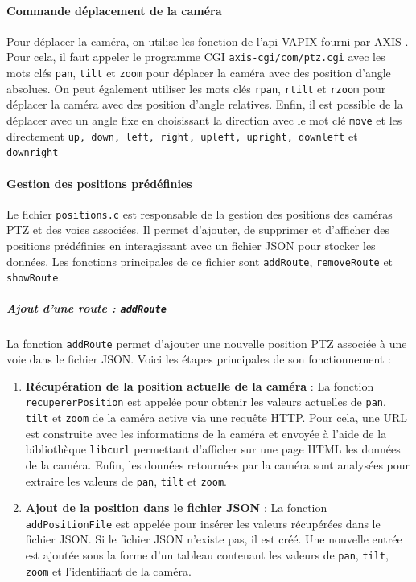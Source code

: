\documentclass[a4paper, 11pt, french]{article}
\begin{document}
\paragraph{Commande déplacement de la caméra}
Pour déplacer la caméra, on utilise les fonction de l'api VAPIX fourni par AXIS \cite{manAPIAxis}. Pour cela, il faut appeler le programme CGI \texttt{axis-cgi/com/ptz.cgi} avec les mots clés \texttt{pan}, \texttt{tilt} et \texttt{zoom} pour déplacer la caméra avec des position d'angle absolues. On peut également utiliser les mots clés \texttt{rpan}, \texttt{rtilt} et \texttt{rzoom} pour déplacer la caméra avec des position d'angle relatives. Enfin, il est possible de la déplacer avec un angle fixe en choisissant la direction avec le mot clé \texttt{move} et les directement \texttt{up, down, left, right, upleft, upright, downleft} et  \texttt{downright} 

\paragraph{Gestion des positions prédéfinies} \label{par:positions}
Le fichier \texttt{positions.c} est responsable de la gestion des positions des caméras PTZ et des voies associées. Il permet d'ajouter, de supprimer et d'afficher des positions prédéfinies en interagissant avec un fichier JSON pour stocker les données. Les fonctions principales de ce fichier sont \texttt{addRoute}, \texttt{removeRoute} et \texttt{showRoute}.

\subparagraph{Ajout d'une route : \texttt{addRoute}}

La fonction \texttt{addRoute} permet d'ajouter une nouvelle position PTZ associée à une voie dans le fichier JSON. Voici les étapes principales de son fonctionnement :
\begin{enumerate}
    \item \textbf{Récupération de la position actuelle de la caméra} :
    La fonction \texttt{recupererPosition} est appelée pour obtenir les valeurs actuelles de \texttt{pan}, \texttt{tilt} et \texttt{zoom} de la caméra active via une requête HTTP. Pour cela, une URL est construite avec les informations de la caméra et envoyée à l'aide de la bibliothèque \texttt{libcurl} permettant d'afficher sur une page HTML les données de la caméra. Enfin, les données retournées par la caméra sont analysées pour extraire les valeurs de \texttt{pan}, \texttt{tilt} et \texttt{zoom}.
    \item \textbf{Ajout de la position dans le fichier JSON} :
    La fonction \texttt{addPositionFile} est appelée pour insérer les valeurs récupérées dans le fichier JSON. Si le fichier JSON n'existe pas, il est créé. Une nouvelle entrée est ajoutée sous la forme d'un tableau contenant les valeurs de \texttt{pan}, \texttt{tilt}, \texttt{zoom} et l'identifiant de la caméra.
\end{enumerate}
\end{document}
